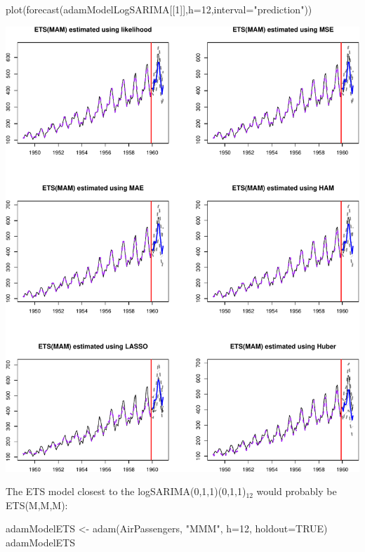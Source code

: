 \documentclass[
]{book}
\newenvironment{Shaded}{\begin{snugshade}}{\end{snugshade}}
\newcommand{\AttributeTok}[1]{\textcolor[rgb]{0.77,0.63,0.00}{#1}}
\newcommand{\ConstantTok}[1]{\textcolor[rgb]{0.00,0.00,0.00}{#1}}
\newcommand{\DecValTok}[1]{\textcolor[rgb]{0.00,0.00,0.81}{#1}}
\newcommand{\FunctionTok}[1]{\textcolor[rgb]{0.00,0.00,0.00}{#1}}
\newcommand{\NormalTok}[1]{#1}
\newcommand{\OtherTok}[1]{\textcolor[rgb]{0.56,0.35,0.01}{#1}}
\newcommand{\StringTok}[1]{\textcolor[rgb]{0.31,0.60,0.02}{#1}}
\theoremstyle{definition}
\theoremstyle{definition}
\theoremstyle{definition}
\theoremstyle{definition}
\theoremstyle{remark}
\begin{document}
\begin{Shaded}
\begin{Highlighting}[]
\FunctionTok{plot}\NormalTok{(}\FunctionTok{forecast}\NormalTok{(adamModelLogSARIMA[[}\DecValTok{1}\NormalTok{]],}\AttributeTok{h=}\DecValTok{12}\NormalTok{,}\AttributeTok{interval=}\StringTok{"prediction"}\NormalTok{))}
\end{Highlighting}
\end{Shaded}

\includegraphics{adam_files/figure-latex/unnamed-chunk-76-1.pdf}

The ETS model closest to the logSARIMA(0,1,1)(0,1,1)\(_{12}\) would probably be ETS(M,M,M):

\begin{Shaded}
\begin{Highlighting}[]
\NormalTok{adamModelETS }\OtherTok{\textless{}{-}} \FunctionTok{adam}\NormalTok{(AirPassengers, }\StringTok{"MMM"}\NormalTok{, }\AttributeTok{h=}\DecValTok{12}\NormalTok{, }\AttributeTok{holdout=}\ConstantTok{TRUE}\NormalTok{)}
\NormalTok{adamModelETS}
\end{Highlighting}
\end{Shaded}
\end{document}
